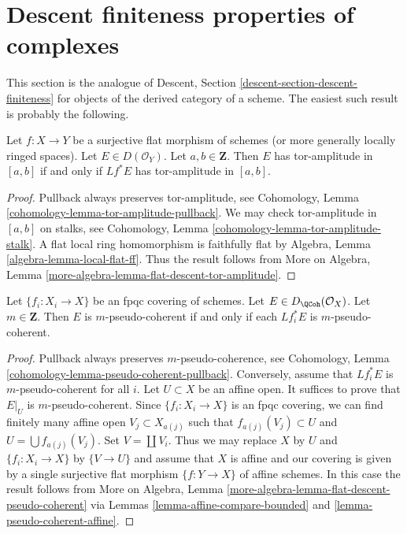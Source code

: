 \section{Descent finiteness properties of complexes}
\label{section-descent-finiteness}

\noindent
This section is the analogue of
Descent, Section \ref{descent-section-descent-finiteness}
for objects of the derived category of a scheme.
The easiest such result is probably the following.

\begin{lemma}
\label{lemma-tor-amplitude-descends}
Let $f : X \to Y$ be a surjective flat morphism of schemes
(or more generally locally ringed spaces).
Let $E \in D(\mathcal{O}_Y)$. Let $a, b \in \mathbf{Z}$.
Then $E$ has tor-amplitude in $[a, b]$ if and only if
$Lf^*E$ has tor-amplitude in $[a, b]$.
\end{lemma}

\begin{proof}
Pullback always preserves tor-amplitude, see
Cohomology, Lemma \ref{cohomology-lemma-tor-amplitude-pullback}.
We may check tor-amplitude in $[a, b]$ on stalks, see
Cohomology, Lemma \ref{cohomology-lemma-tor-amplitude-stalk}.
A flat local ring homomorphism is faithfully flat by
Algebra, Lemma \ref{algebra-lemma-local-flat-ff}.
Thus the result follows from
More on Algebra, Lemma
\ref{more-algebra-lemma-flat-descent-tor-amplitude}.
\end{proof}

\begin{lemma}
\label{lemma-pseudo-coherent-descends-fpqc}
Let $\{f_i : X_i \to X\}$ be an fpqc covering of schemes. Let
$E \in D_\QCoh(\mathcal{O}_X)$. Let $m \in \mathbf{Z}$.
Then $E$ is $m$-pseudo-coherent if and only if each
$Lf_i^*E$ is $m$-pseudo-coherent.
\end{lemma}

\begin{proof}
Pullback always preserves $m$-pseudo-coherence, see
Cohomology, Lemma \ref{cohomology-lemma-pseudo-coherent-pullback}.
Conversely, assume that $Lf_i^*E$ is $m$-pseudo-coherent for all $i$.
Let $U \subset X$ be an affine open. It suffices to prove that
$E|_U$ is $m$-pseudo-coherent. Since $\{f_i : X_i \to X\}$ is an
fpqc covering, we can find finitely many affine open $V_j \subset X_{a(j)}$
such that $f_{a(j)}(V_j) \subset U$ and $U = \bigcup f_{a(j)}(V_j)$.
Set $V = \coprod V_i$.
Thus we may replace $X$ by $U$ and $\{f_i : X_i \to X\}$ by
$\{V \to U\}$ and assume that $X$ is affine and our covering
is given by a single surjective flat morphism $\{f : Y \to X\}$
of affine schemes. In this case the result follows from
More on Algebra, Lemma \ref{more-algebra-lemma-flat-descent-pseudo-coherent}
via Lemmas \ref{lemma-affine-compare-bounded} and
\ref{lemma-pseudo-coherent-affine}.
\end{proof}

